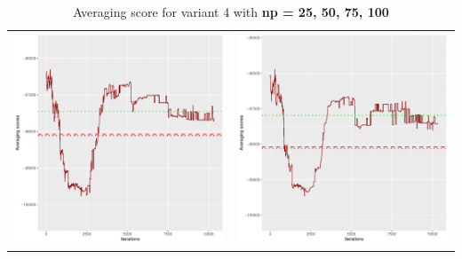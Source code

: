 \documentclass[]{scrartcl}
\begin{document}
\begin{table}[h!]
\begin{tabular}{cc}
\includegraphics[scale = 0.4]{./figs/hepar2/v4/75/avgBoundsEvolution-10352.pdf} & 
\includegraphics[scale = 0.4]{./figs/hepar2/v4/100/avgBoundsEvolution-10352.pdf} \\
\end{tabular}
\caption{Averaging score for variant 4 with \textbf{np =  25, 50, 75, 100 }}
\end{table}
\end{document}
